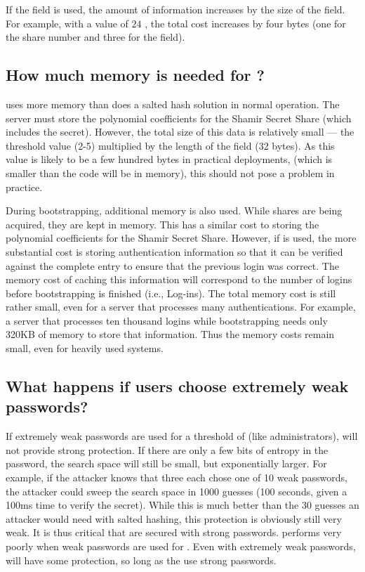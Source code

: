 If the \partialbytes
field is used, the amount of information increases by the size of the field. 
For example, with a value of $24$ \partialbytes, the total cost increases by 
four bytes (one for the share number and three for the \partialbytes field). 

\subsection{How much memory is needed for \PPH?}

\PPH uses more memory than does a salted hash solution in normal operation.  
The server must store the polynomial coefficients for the 
Shamir Secret Share (which includes the secret).  However, the total size
of this data is relatively small --- the threshold value (2-5) multiplied by 
the length of the \sxh field (32 bytes).  As this value is likely to be
a few hundred bytes in practical deployments, (which is smaller than the \PPH 
code will be in memory), this should not pose a problem in practice.

During bootstrapping, additional memory is also used.  While shares are being
acquired, they are kept in memory.  This has a similar cost to storing
the polynomial coefficients for the Shamir Secret Share.
However, if \partialverification is used, the more
substantial cost is storing authentication information so that it can be
verified against the complete entry to ensure that the previous login was
correct. The memory cost of caching this information will correspond to the
number of logins before bootstrapping is finished (i.e., \sxh * Log-ins).
The total memory cost is still rather small, even for a server that processes
many authentications.  For example, a server that processes ten thousand logins
while bootstrapping needs only 320KB of memory to store that information.  Thus
the memory costs remain small, even for heavily used systems.
 


\subsection{What happens if users choose extremely weak passwords?}
\label{SUBSEC:bad-passwords}

If extremely weak passwords are
used for a threshold of \thresholdaccounts (like administrators), \PPH will not
provide strong protection.   If there are only a few bits of entropy in the
password, the search space will still be small, but exponentially larger.   
For example, if the attacker knows that three \thresholdaccounts each chose one
of 10 weak passwords, the attacker could sweep the search space in 1000
guesses (100 seconds, given a 100ms time to verify the secret).  While this
is much better than the 30 guesses an attacker would need with salted hashing,
this protection is obviously still very weak.  It
is thus critical that \thresholdaccounts are secured with strong passwords.  
\PPH performs very poorly when weak passwords are used for \thresholdaccounts.  Even 
with extremely weak passwords, \thresholdlessaccounts will have some 
protection, so long as the \thresholdaccounts use strong passwords.  

